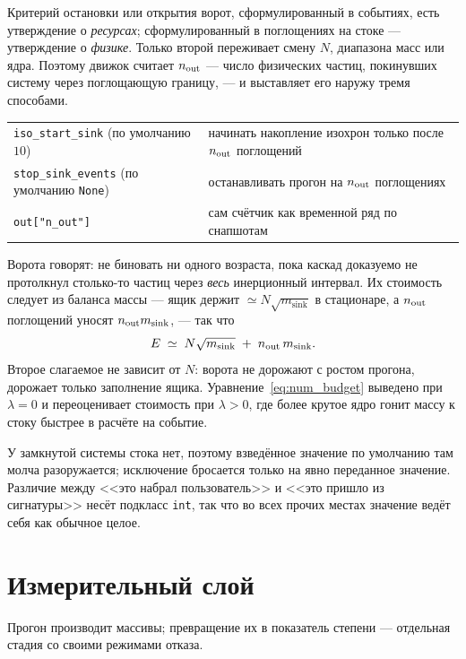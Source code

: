 \documentclass[a4paper,12pt]{article}
\newcommand{\msink}{m_{\mathrm{sink}}}
\newcommand{\code}[1]{\texttt{#1}}
\begin{document}
Критерий остановки или открытия ворот, сформулированный в событиях, есть
утверждение о \emph{ресурсах}; сформулированный в поглощениях на стоке ---
утверждение о \emph{физике}. Только второй переживает смену $N$, диапазона
масс или ядра. Поэтому движок считает $n_{\rm out}$ --- число физических
частиц, покинувших систему через поглощающую границу, --- и выставляет его
наружу тремя способами.

\begin{center}
\small
\begin{tabular}{@{}l p{8.2cm}@{}}
\toprule
\code{iso\_start\_sink} (по умолчанию $10$) &
  начинать накопление изохрон только после $n_{\rm out}$ поглощений \\
\code{stop\_sink\_events} (по умолчанию \code{None}) &
  останавливать прогон на $n_{\rm out}$ поглощениях \\
\code{out["n\_out"]} &
  сам счётчик как временной ряд по снапшотам \\
\bottomrule
\end{tabular}
\end{center}

Ворота говорят: не биновать ни одного возраста, пока каскад доказуемо не
протолкнул столько-то частиц через \emph{весь} инерционный интервал. Их
стоимость следует из баланса массы --- ящик держит $\simeq N\sqrt{\msink}$ в
стационаре, а $n_{\rm out}$ поглощений уносят $n_{\rm out}\msink$, --- так
что
\begin{equation}
  E \;\simeq\; N\sqrt{\msink} \;+\; n_{\rm out}\,\msink .
  \label{eq:num_budget}
\end{equation}
Второе слагаемое не зависит от $N$: ворота не дорожают с ростом прогона,
дорожает только заполнение ящика. Уравнение~\eqref{eq:num_budget} выведено
при $\lambda = 0$ и переоценивает стоимость при $\lambda > 0$, где более
крутое ядро гонит массу к стоку быстрее в расчёте на событие.

У замкнутой системы стока нет, поэтому взведённое значение по умолчанию там
молча разоружается; исключение бросается только на явно переданное
значение. Различие между <<это набрал пользователь>> и <<это пришло из
сигнатуры>> несёт подкласс \code{int}, так что во всех прочих местах
значение ведёт себя как обычное целое.

\section{Измерительный слой}
\label{sec:num_measure}

Прогон производит массивы; превращение их в показатель степени --- отдельная
стадия со своими режимами отказа.
\end{document}
